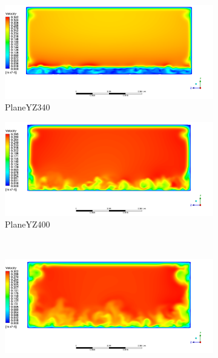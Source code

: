 	\begin{figure}[H]
		\begin{subfigure}{.5\textwidth}
			\centering
			\includegraphics[width=1.1\linewidth]{../Assets/T96_Velocity_ContourYZ340}
			\caption{PlaneYZ340}
			\label{fig:T96VelocityContourYZ340}
		\end{subfigure}%
		\begin{subfigure}{.5\textwidth}
			\centering
			\includegraphics[width=1.1\linewidth]{../Assets/T96_Velocity_ContourYZ400}
			\caption{PlaneYZ400}
			\label{fig:T96VelocityContourYZ400}
		\end{subfigure}
		\\
		\begin{subfigure}{.5\textwidth}
			\centering
			\includegraphics[width=1.1\linewidth]{../Assets/T96_Velocity_ContourYZ600}

\end{subfigure}
\end{figure}
